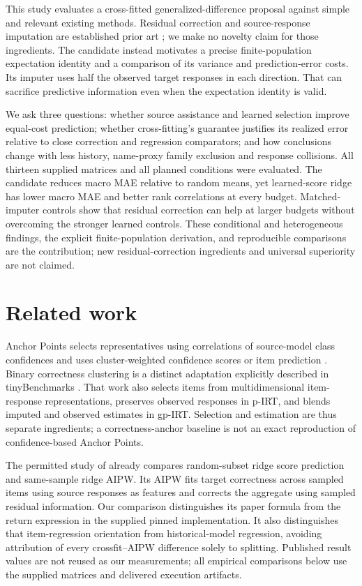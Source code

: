 \documentclass{article}
\begin{document}
This study evaluates a cross-fitted generalized-difference proposal against simple and relevant existing methods. Residual correction and source-response imputation are established prior art \citep{zhang2025misses}; we make no novelty claim for those ingredients. The candidate instead motivates a precise finite-population expectation identity and a comparison of its variance and prediction-error costs. Its imputer uses half the observed target responses in each direction. That can sacrifice predictive information even when the expectation identity is valid.

We ask three questions: whether source assistance and learned selection improve equal-cost prediction; whether cross-fitting's guarantee justifies its realized error relative to close correction and regression comparators; and how conclusions change with less history, name-proxy family exclusion and response collisions. All thirteen supplied matrices and all planned conditions were evaluated. The candidate reduces macro MAE relative to random means, yet learned-score ridge has lower macro MAE and better rank correlations at every budget. Matched-imputer controls show that residual correction can help at larger budgets without overcoming the stronger learned controls. These conditional and heterogeneous findings, the explicit finite-population derivation, and reproducible comparisons are the contribution; new residual-correction ingredients and universal superiority are not claimed.

\section{Related work}
Anchor Points selects representatives using correlations of source-model class confidences and uses cluster-weighted confidence scores or item prediction \citep{vivek2024anchor}. Binary correctness clustering is a distinct adaptation explicitly described in tinyBenchmarks \citep{maiapolo2024tiny}. That work also selects items from multidimensional item-response representations, preserves observed responses in p-IRT, and blends imputed and observed estimates in gp-IRT. Selection and estimation are thus separate ingredients; a correctness-anchor baseline is not an exact reproduction of confidence-based Anchor Points.

The permitted study of \citet{zhang2025misses} already compares random-subset ridge score prediction and same-sample ridge AIPW. Its AIPW fits target correctness across sampled items using source responses as features and corrects the aggregate using sampled residual information. Our comparison distinguishes its paper formula from the return expression in the supplied pinned implementation. It also distinguishes that item-regression orientation from historical-model regression, avoiding attribution of every crossfit--AIPW difference solely to splitting. Published result values are not reused as our measurements; all empirical comparisons below use the supplied matrices and delivered execution artifacts.
\end{document}
